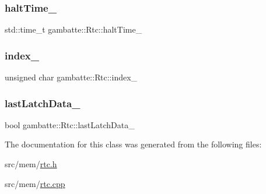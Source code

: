 \subsubsection{\texorpdfstring{halt\+Time\+\_\+}{haltTime\_}}
{\footnotesize\ttfamily std\+::time\+\_\+t gambatte\+::\+Rtc\+::halt\+Time\+\_\+\hspace{0.3cm}{\ttfamily [private]}}

\mbox{\label{classgambatte_1_1Rtc_af578e2d9c80922c5d75cc4f059331e35}} 
\subsubsection{\texorpdfstring{index\+\_\+}{index\_}}
{\footnotesize\ttfamily unsigned char gambatte\+::\+Rtc\+::index\+\_\+\hspace{0.3cm}{\ttfamily [private]}}

\mbox{\label{classgambatte_1_1Rtc_a83aa7c62a3713978fdf3969f7cd60977}} 
\subsubsection{\texorpdfstring{last\+Latch\+Data\+\_\+}{lastLatchData\_}}
{\footnotesize\ttfamily bool gambatte\+::\+Rtc\+::last\+Latch\+Data\+\_\+\hspace{0.3cm}{\ttfamily [private]}}



The documentation for this class was generated from the following files\+:\begin{DoxyCompactItemize}
\item 
src/mem/\hyperlink{rtc_8h}{rtc.\+h}\item 
src/mem/\hyperlink{rtc_8cpp}{rtc.\+cpp}\end{DoxyCompactItemize}
